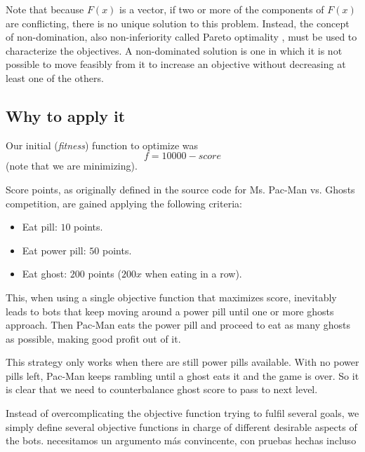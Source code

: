 \documentclass{llncs}
\newcommand{\pacman}{Ms. Pac-Man vs. Ghosts }
\newcommand{\paco}{Pac-Man }
\begin{document}
Note that because $F(x)$ is a vector, if two or more of the components of $F(x)$ are conflicting, there is no unique solution to this problem. Instead, the concept of non-domination, also non-inferiority called Pareto optimality \cite{Censor:78}, must be used to characterize the objectives. A non-dominated solution is one in which it is not possible to move feasibly from it to increase an objective without decreasing at least one of the others.


\subsection{Why to apply it}
Our initial (\textit{fitness}) function to optimize was
\begin{equation} %
f = 10000 - score
\end{equation}
(note that we are minimizing).

Score points, as originally defined in the source code for \pacman competition, are gained applying the following criteria:
\begin{itemize}
\label{vanilla_pacman_score}
\item Eat pill: $10$ points.
\item Eat power pill: $50$ points.
\item Eat ghost: $200$ points ($200x$ when eating in a row).
\end{itemize}

This, when using a single objective function that maximizes score, inevitably leads to bots that keep moving around a power pill until one or more ghosts approach. Then \paco eats the power pill and proceed to eat as many ghosts as possible, making good profit out of it.

This strategy only works when there are still power pills available. With no power pills left, \paco keeps rambling until a ghost eats it and the game is over. So it is clear that we need to counterbalance ghost score to pass to next level.

Instead of overcomplicating the objective function trying to fulfil several goals, we simply define several objective functions in charge of different desirable aspects of the bots.
{\color{red} necesitamos un argumento más convincente, con pruebas hechas incluso}
\end{document}
